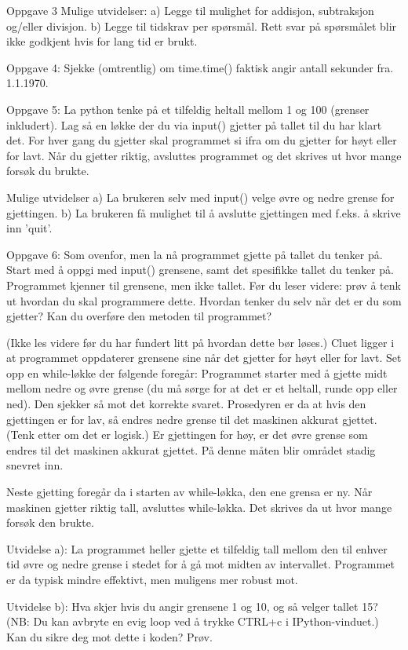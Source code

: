 \documentclass[a4paper,11pt,utf8]{book}
\begin{document}
Oppgave 3
Mulige utvidelser:
a) Legge til mulighet for addisjon, subtraksjon og/eller divisjon. 
b) Legge til tidskrav per spørsmål.
Rett svar på spørsmålet blir ikke godkjent hvis for lang tid er brukt. 


Oppgave 4:
Sjekke (omtrentlig) om time.time() faktisk angir antall sekunder fra. 1.1.1970. 


Oppgave 5:
La python tenke på et tilfeldig heltall mellom 1 og 100 (grenser inkludert). 
Lag så en løkke der du via input() gjetter på tallet til du har klart det. 
For hver gang du gjetter skal programmet si ifra om du gjetter for høyt eller for lavt.
Når du gjetter riktig, avsluttes programmet og det skrives ut hvor mange forsøk du brukte. 

Mulige utvidelser
a) La brukeren selv med input() velge øvre og nedre grense for gjettingen.
b) La brukeren få mulighet til å avslutte gjettingen med f.eks. å skrive inn 'quit'.


Oppgave 6: Som ovenfor, men la nå programmet gjette på tallet du tenker på.
Start med å oppgi med input() grensene, samt det spesifikke tallet du tenker på.
Programmet kjenner til grensene, men ikke tallet.
Før du leser videre: prøv å tenk ut hvordan du skal programmere dette.
Hvordan tenker du selv når det er du som gjetter?
Kan du overføre den metoden til programmet?

(Ikke les videre før du har fundert litt på hvordan dette bør løses.) 
Cluet ligger i at programmet oppdaterer grensene sine når det gjetter for høyt
eller for lavt. 
Set opp en while-løkke der følgende foregår: 
Programmet starter med å gjette midt mellom nedre og øvre grense
(du må sørge for at det er et heltall, runde opp eller ned).
Den sjekker så mot det korrekte svaret. 
Prosedyren er da at hvis den gjettingen er for lav,
så endres nedre grense til det maskinen akkurat gjettet.
(Tenk etter om det er logisk.) 
Er gjettingen for høy, er det øvre grense som endres til det maskinen akkurat gjettet.
På denne måten blir området stadig snevret inn.

Neste gjetting foregår da i starten av while-løkka, den ene grensa er ny. 
Når maskinen gjetter riktig tall, avsluttes while-løkka.
Det skrives da ut hvor mange forsøk den brukte. 

Utvidelse a): La programmet heller gjette et tilfeldig tall mellom den til enhver tid
øvre og nedre grense i stedet for å gå mot midten av intervallet.
Programmet er da typisk mindre effektivt, men muligens mer robust mot.

Utvidelse b): Hva skjer hvis du angir grensene 1 og 10, og så velger tallet 15?
(NB: Du kan avbryte en evig loop ved å trykke CTRL+c i IPython-vinduet.) 
Kan du sikre deg mot dette i koden? Prøv. 
\end{document}
